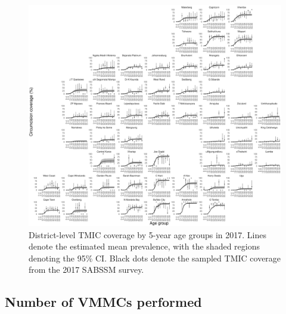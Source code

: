 \documentclass{article}
\begin{document}
\begin{appendix}
\begin{figure}[H]
	\centering
	\includegraphics[width = \linewidth]{Figures/suppmat/ModelFit/TMICPrev_5year_District_2017_withsurveypoints}
	\caption{District-level TMIC coverage by 5-year age groups in 2017. Lines denote the estimated mean prevalence, with the shaded regions denoting the 95\% CI. Black dots denote the sampled TMIC coverage from the 2017 SABSSM survey.}
\end{figure}


\subsection{Number of VMMCs performed}



\end{appendix}
\end{document}
